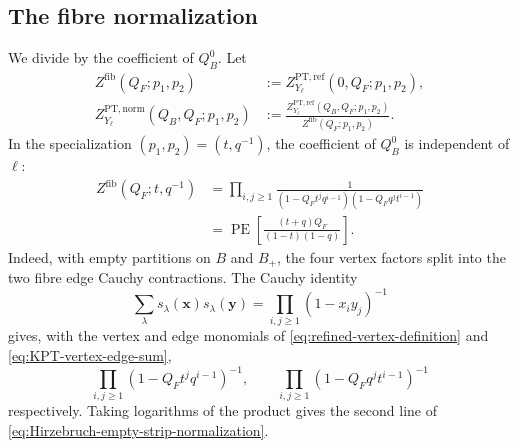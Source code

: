 \documentclass{amsart}
\theoremstyle{definition}
\numberwithin{equation}{section}
\newcommand{\PE}{\operatorname{PE}}
\newcommand{\PT}{\mathrm{PT}}
\begin{document}
\subsection{The fibre normalization}
We divide by the coefficient of \(Q_B^0\).  Let
\begin{align}
 Z^{\mathrm{fib}}(Q_F;p_1,p_2)
&:={Z}_{Y_\ell}^{\PT,\mathrm{ref}}(0,Q_F;p_1,p_2),
\label{eq:Hirzebruch-fibre-series}\\
 Z_{Y_\ell}^{\PT,\mathrm{norm}}(Q_B,Q_F;p_1,p_2)
&:=\frac{Z_{Y_\ell}^{\PT,\mathrm{ref}}(Q_B,Q_F;p_1,p_2)}
 {Z^{\mathrm{fib}}(Q_F;p_1,p_2)}.
\label{eq:Hirzebruch-base-normalization}
\end{align}
In the specialization \((p_1,p_2)=(t,q^{-1})\), the coefficient of \(Q_B^0\) is independent of \(\ell\):
\begin{equation}
\begin{aligned}
 Z^{\mathrm{fib}}(Q_F;t,q^{-1})
 &=\prod_{i,j\geq1}
   \frac1{(1-Q_Ft^jq^{i-1})(1-Q_Fq^jt^{i-1})}\\
 &=\PE\left[\frac{(t+q)Q_F}{(1-t)(1-q)}\right].
\end{aligned}
\label{eq:Hirzebruch-empty-strip-normalization}
\end{equation}
Indeed, with empty partitions on \(B\) and \(B_+\), the four vertex factors split into the two fibre edge Cauchy contractions.  The Cauchy identity
\[
 \sum_\lambda s_\lambda(\mathbf x)s_\lambda(\mathbf y)
 =\prod_{i,j\geq1}(1-x_iy_j)^{-1}
\]
gives, with the vertex and edge monomials of \eqref{eq:refined-vertex-definition} and \eqref{eq:KPT-vertex-edge-sum},
\[
 \prod_{i,j\geq1}(1-Q_Ft^jq^{i-1})^{-1},
 \qquad
 \prod_{i,j\geq1}(1-Q_Fq^jt^{i-1})^{-1}
\]
respectively.  Taking logarithms of the product gives the second line of \eqref{eq:Hirzebruch-empty-strip-normalization}.
\end{document}
